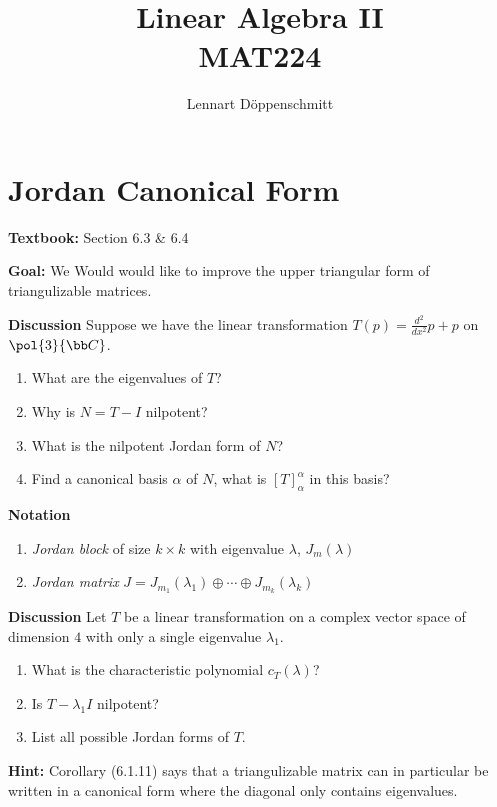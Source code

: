 \documentclass[letterpaper, 10pt]{article}
\begin{document}

\title{Linear Algebra II \\ \Large{MAT224}}
\author{Lennart Döppenschmitt}

\section*{Jordan Canonical Form}%
\textbf{Textbook:} Section 6.3 \& 6.4

\lb
\textbf{Goal:} We Would would like to improve the upper triangular form of
triangulizable matrices.


\lb
\textbf{Discussion}
\lb
Suppose we have the linear transformation $T(p) = \frac{d^2}{dx^2} p + p$ on $\pol{3}{\bb C}$.
\begin{enumerate}
    \item What are the eigenvalues of $T$?
    \item Why is $N = T - I$ nilpotent?
    \item What is the nilpotent Jordan form of $N$?
    \item Find a canonical basis $α$ of $N$, what is $[T]_α^α$ in this basis?
\end{enumerate}

\newpage
\lb
\textbf{Notation}
\lb
\begin{enumerate}
    \item \emph{Jordan block} of size $k \times k$ with eigenvalue $λ$,  $J_m(λ)$
    \vspace{140pt}
\item \emph{Jordan matrix} $J = J_{m_1}(λ_1) \oplus \cdots \oplus J_{m_k}(λ_k)$
\end{enumerate}



\vspace{200pt}
\lb
\textbf{Discussion}
\lb
Let $T$ be a linear transformation on a complex vector space of dimension $4$ with only a single
eigenvalue $λ_1$.
\begin{enumerate}
    \item What is the characteristic polynomial $c_T(λ)$?
    \item Is $T- λ_1 I$ nilpotent?
    \item List all possible Jordan forms of $T$.
\end{enumerate}
\textbf{Hint: } Corollary (6.1.11) says that a triangulizable matrix can in particular be written
in a canonical form where the diagonal only contains eigenvalues.
\end{document}
